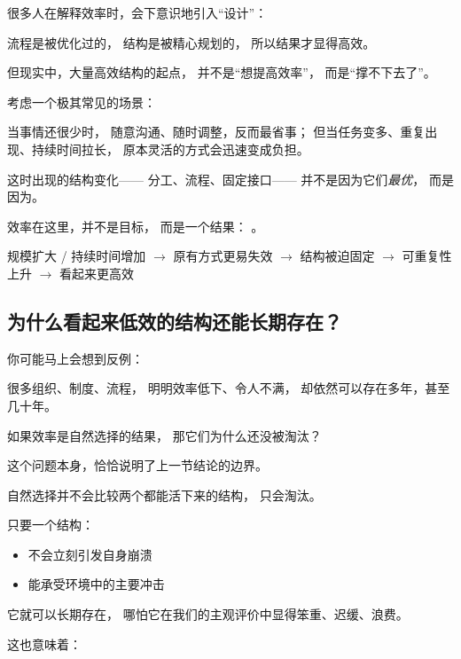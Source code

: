 \documentclass[../main.tex]{subfiles}
\begin{document}
\begin{readingnote}
	很多人在解释效率时，会下意识地引入“设计”：
	
	流程是被优化过的，
	结构是被精心规划的，
	所以结果才显得高效。
	
	但现实中，大量高效结构的起点，
	并不是“想提高效率”，
	而是“撑不下去了”。
\end{readingnote}

考虑一个极其常见的场景：

当事情还很少时，
随意沟通、随时调整，反而最省事；
但当任务变多、重复出现、持续时间拉长，
原本灵活的方式会迅速变成负担。

这时出现的结构变化——
分工、流程、固定接口——
并不是因为它们\emph{最优}，
而是因为。

效率在这里，并不是目标，
而是一个结果：
。

\begin{logicmap}
	规模扩大 / 持续时间增加
	$\rightarrow$ 原有方式更易失效
	$\rightarrow$ 结构被迫固定
	$\rightarrow$ 可重复性上升
	$\rightarrow$ 看起来更高效
\end{logicmap}

\subsection{为什么看起来低效的结构还能长期存在？}

\begin{readingnote}
	你可能马上会想到反例：
	
	很多组织、制度、流程，
	明明效率低下、令人不满，
	却依然可以存在多年，甚至几十年。
	
	如果效率是自然选择的结果，
	那它们为什么还没被淘汰？
\end{readingnote}

这个问题本身，恰恰说明了上一节结论的边界。

自然选择并不会比较两个都能活下来的结构，
只会淘汰。

只要一个结构：
\begin{itemize}
	\item 不会立刻引发自身崩溃
	\item 能承受环境中的主要冲击
\end{itemize}

它就可以长期存在，
哪怕它在我们的主观评价中显得笨重、迟缓、浪费。

这也意味着：

\end{document}
